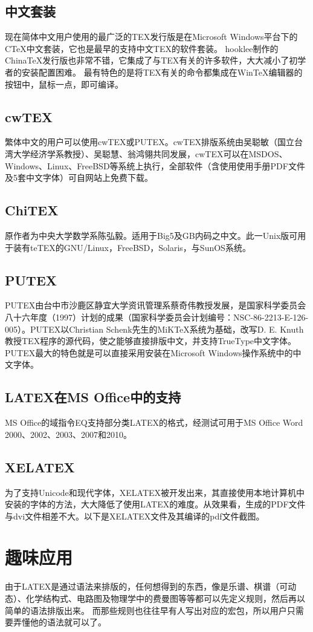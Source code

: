 \documentclass[12pt]{article}
\begin{document}
        \subsection{中文套装}
        现在简体中文用户使用的最广泛的TEX发行版是在Microsoft Windows平台下的CTeX中文套装，它也是最早的支持中文TEX的软件套装。
        hooklee制作的ChinaTeX发行版也非常不错，它集成了与TEX有关的许多软件，大大减小了初学者的安装配置困难。
        最有特色的是将TEX有关的命令都集成在WinTeX编辑器的按钮中，鼠标一点，即可编译。

        \subsection{cwTEX}
        繁体中文的用户可以使用cwTEX或PUTEX。cwTEX排版系统由吴聪敏（国立台湾大学经济学系教授）、吴聪慧、翁鸿翎共同发展，cwTEX可以在MSDOS、Windows、Linux、FreeBSD等系统上执行，全部软件（含使用使用手册PDF文件及5套中文字体）可自网站上免费下载。

        \subsection{ChiTEX}
        原作者为中央大学数学系陈弘毅。适用于Big5及GB内码之中文。此一Unix版可用于装有teTEX的GNU/Linux，FreeBSD，Solaris，与SunOS系统。

        \subsection{PUTEX}
        PUTEX由台中市沙鹿区静宜大学资讯管理系蔡奇伟教授发展，是国家科学委员会八十六年度（1997）计划的成果（国家科学委员会计划编号：NSC-86-2213-E-126-005）。PUTEX以Christian Schenk先生的MiKTeX系统为基础，改写D. E. Knuth教授TEX程序的源代码，使之能够直接排版中文，并支持TrueType中文字体。PUTEX最大的特色就是可以直接采用安装在Microsoft Windows操作系统中的中文字体。

        \subsection{LATEX在MS Office中的支持}
        MS Office的域指令EQ支持部分类LATEX的格式，经测试可用于MS Office Word 2000、2002、2003、2007和2010。

        \subsection{XELATEX}
        为了支持Unicode和现代字体，XELATEX被开发出来，其直接使用本地计算机中安装的字体的方法，大大降低了使用LATEX的难度。从效果看，生成的PDF文件与dvi文件相差不大。以下是XELATEX文件及其编译的pdf文件截图。

    \section{趣味应用}
    由于LATEX是通过语法来排版的，任何想得到的东西，像是乐谱、棋谱（可动态）、化学结构式、电路图及物理学中的费曼图等等都可以先定义规则，然后再以简单的语法排版出来。
    而那些规则也往往早有人写出对应的宏包，所以用户只需要弄懂他的语法就可以了。

    
\end{document}
